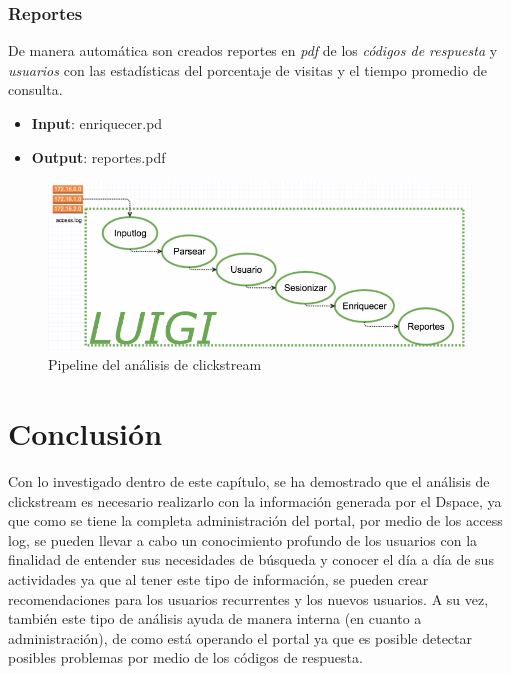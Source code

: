 \subsubsection{ Reportes}\label{vi-reportes}

De manera automática son creados reportes en \emph{pdf} de los
\emph{códigos de respuesta} y \emph{usuarios} con las estadísticas del
porcentaje de visitas y el tiempo promedio de consulta.

\begin{itemize}
\item \textbf{Input}: enriquecer.pd
\item \textbf{Output}: reportes.pdf
\end{itemize}


\begin{figure}[H]
\centering
\includegraphics[width=1\textwidth]{Figures/unnamed-chunk-1-1}
\caption{Pipeline del análisis de clickstream}
\end{figure}

\section{Conclusión}

 Con lo investigado dentro de este capítulo, se ha demostrado que el análisis de clickstream es necesario realizarlo con la información generada por el Dspace, ya que como se tiene la completa administración del portal, por medio de los access log, se pueden llevar a cabo un conocimiento profundo de los usuarios con la finalidad de entender sus necesidades de búsqueda y conocer el día a día de sus actividades ya que al tener este tipo de información, se pueden crear recomendaciones para los usuarios recurrentes y los nuevos usuarios. A su vez, también este tipo de análisis ayuda de manera interna (en cuanto a administración), de como está operando el portal ya que es posible detectar posibles problemas por medio de los códigos de respuesta.


